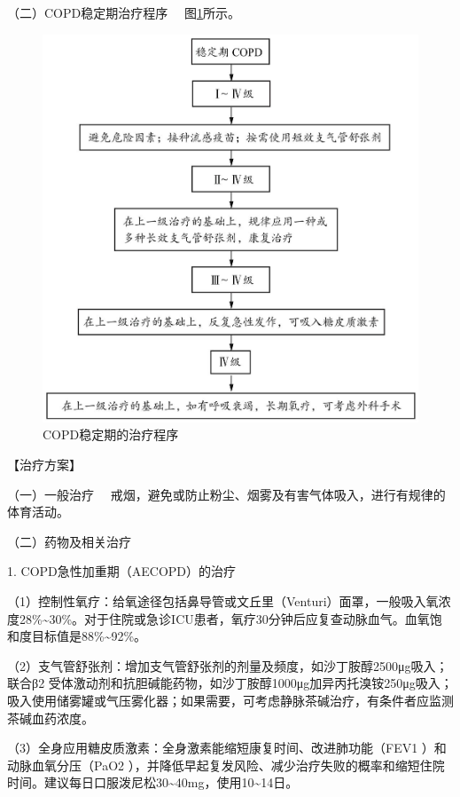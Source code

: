 {（二）COPD稳定期治疗程序} 　图\ref{fig1-4-2}所示。

\begin{figure}[!htbp]
 \centering
 \includegraphics{./images/Image00004.jpg}
 \captionsetup{justification=centering}
 \caption{COPD稳定期的治疗程序}
 \label{fig1-4-2}
  \end{figure} 

【治疗方案】

{（一）一般治疗}
　戒烟，避免或防止粉尘、烟雾及有害气体吸入，进行有规律的体育活动。

{（二）药物及相关治疗}

1. COPD急性加重期（AECOPD）的治疗

（1）控制性氧疗：给氧途径包括鼻导管或文丘里（Venturi）面罩，一般吸入氧浓度28\%\textasciitilde{}30\%。对于住院或急诊ICU患者，氧疗30分钟后应复查动脉血气。血氧饱和度目标值是88\%\textasciitilde{}92\%。

（2）支气管舒张剂：增加支气管舒张剂的剂量及频度，如沙丁胺醇2500μg吸入；联合β{2}
受体激动剂和抗胆碱能药物，如沙丁胺醇1000μg加异丙托溴铵250μg吸入；吸入使用储雾罐或气压雾化器；如果需要，可考虑静脉茶碱治疗，有条件者应监测茶碱血药浓度。

（3）全身应用糖皮质激素：全身激素能缩短康复时间、改进肺功能（FEV{1}
）和动脉血氧分压（PaO{2}
），并降低早起复发风险、减少治疗失败的概率和缩短住院时间。建议每日口服泼尼松30\textasciitilde{}40mg，使用10\textasciitilde{}14日。

